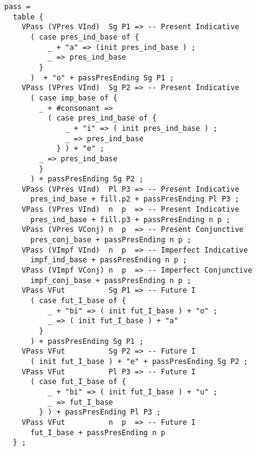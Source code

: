 \begin{lstlisting}[float=h!tp,caption={Ausschnitt aus der Funktion \texttt{mkVerb} um passive Verbformen zu bilden (vgl. \textbf{ResLat.gf})},label={GF-Res-MkVerb-Pass},basicstyle=\small]
pass = 
  table {
    VPass (VPres VInd)  Sg P1 => -- Present Indicative
      ( case pres_ind_base of {
          _ + "a" => (init pres_ind_base ) ;
          _ => pres_ind_base
        }
      )  + "o" + passPresEnding Sg P1 ;
    VPass (VPres VInd)  Sg P2 => -- Present Indicative
      ( case imp_base of {
        _ + #consonant => 
          ( case pres_ind_base of {
              _ + "i" => ( init pres_ind_base ) ;
              _ => pres_ind_base 
            } ) + "e" ;
        _ => pres_ind_base 
        }
      ) + passPresEnding Sg P2 ;
    VPass (VPres VInd)  Pl P3 => -- Present Indicative
      pres_ind_base + fill.p2 + passPresEnding Pl P3 ;
    VPass (VPres VInd)  n  p  => -- Present Indicative
      pres_ind_base + fill.p3 + passPresEnding n p ;
    VPass (VPres VConj) n  p  => -- Present Conjunctive
      pres_conj_base + passPresEnding n p ;
    VPass (VImpf VInd)  n  p  => -- Imperfect Indicative
      impf_ind_base + passPresEnding n p ;
    VPass (VImpf VConj) n  p  => -- Imperfect Conjunctive
      impf_conj_base + passPresEnding n p ;
    VPass VFut          Sg P1 => -- Future I
      ( case fut_I_base of {
          _ + "bi" => ( init fut_I_base ) + "o" ;
          _ => ( init fut_I_base ) + "a"
        }
      ) + passPresEnding Sg P1 ;
    VPass VFut          Sg P2 => -- Future I
      ( init fut_I_base ) + "e" + passPresEnding Sg P2 ;
    VPass VFut          Pl P3 => -- Future I
      ( case fut_I_base of {
          _ + "bi" => ( init fut_I_base ) + "u" ;
          _ => fut_I_base
        } ) + passPresEnding Pl P3 ;
    VPass VFut          n  p  => -- Future I
      fut_I_base + passPresEnding n p
  } ;
\end{lstlisting}
